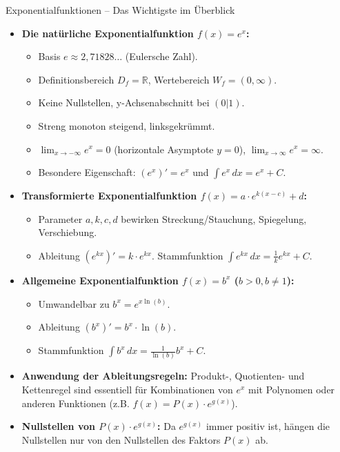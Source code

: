 \begin{kurzknappumgebung}{Exponentialfunktionen – Das Wichtigste im Überblick}
\begin{itemize}
    \item \textbf{Die natürliche Exponentialfunktion $f(x)=e^x$:}
        \begin{itemize}
            \item Basis $e \approx 2,71828\dots$ (Eulersche Zahl).
            \item Definitionsbereich $D_f = \mathbb{R}$, Wertebereich $W_f = (0, \infty)$.
            \item Keine Nullstellen, y-Achsenabschnitt bei $(0|1)$.
            \item Streng monoton steigend, linksgekrümmt.
            \item $\lim_{x \to -\infty} e^x = 0$ (horizontale Asymptote $y=0$), $\lim_{x \to \infty} e^x = \infty$.
            \item Besondere Eigenschaft: $(e^x)' = e^x$ und $\int e^x \,dx = e^x + C$.
        \end{itemize}
    \item \textbf{Transformierte Exponentialfunktion $f(x) = a \cdot e^{k(x-c)} + d$:}
        \begin{itemize}
            \item Parameter $a, k, c, d$ bewirken Streckung/Stauchung, Spiegelung, Verschiebung.
            \item Ableitung $(e^{kx})' = k \cdot e^{kx}$. Stammfunktion $\int e^{kx} \,dx = \frac{1}{k}e^{kx} + C$.
        \end{itemize}
    \item \textbf{Allgemeine Exponentialfunktion $f(x) = b^x$ ($b>0, b\neq 1$):}
        \begin{itemize}
            \item Umwandelbar zu $b^x = e^{x \ln(b)}$.
            \item Ableitung $(b^x)' = b^x \cdot \ln(b)$.
            \item Stammfunktion $\int b^x \,dx = \frac{1}{\ln(b)}b^x + C$.
        \end{itemize}
    \item \textbf{Anwendung der Ableitungsregeln:} Produkt-, Quotienten- und Kettenregel sind essentiell für Kombinationen von $e^x$ mit Polynomen oder anderen Funktionen (z.B. $f(x) = P(x) \cdot e^{g(x)}$).
    \item \textbf{Nullstellen von $P(x) \cdot e^{g(x)}$:} Da $e^{g(x)}$ immer positiv ist, hängen die Nullstellen nur von den Nullstellen des Faktors $P(x)$ ab.

\end{itemize}
\end{kurzknappumgebung}
